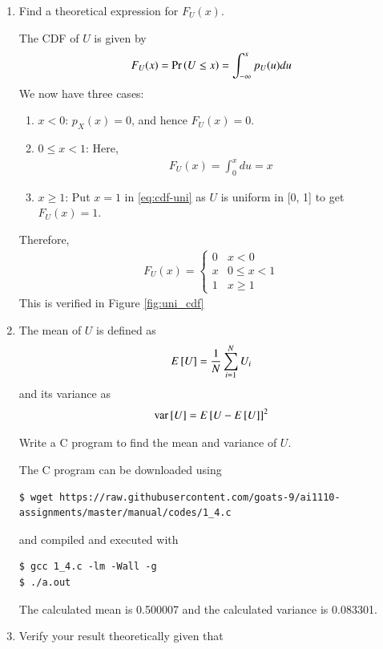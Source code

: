 \documentclass[journal,12pt,twocolumn]{IEEEtran}
\renewcommand\thesection{\arabic{section}}
\begin{document}
\begin{enumerate}[label=\thesection.\arabic*
,ref=\thesection.\theenumi]
%
\item
Find a theoretical expression for $F_{U}(x)$.

\solution
The CDF of $U$ is given by
		\begin{align}
			F_U(x) = \Pr\left(U \leq x\right) = \int_{-\infty}^{x}p_U(u)du
		\end{align}
We now have three cases:
		\begin{enumerate}
			\item $x < 0$: $p_X(x) = 0$, and hence $F_U(x) = 0$.
			\item $0 \leq x < 1$: Here,
				\begin{align}
					F_U(x) = \int_{0}^{x}du = x
					\label{eq:cdf-uni}
				\end{align}
			\item $x \geq 1$: Put $x = 1$ in \eqref{eq:cdf-uni} as $U$ is uniform in [0, 1] to get $F_U(x) = 1$.
		\end{enumerate}
Therefore,
		\begin{align}
			F_U(x) = 
			\begin{cases}
				0 & x < 0 \\
				x & 0 \leq x < 1 \\
				1 & x \geq 1
			\end{cases}
			\label{eq:cdf-ans}
		\end{align}
This is verified in Figure \eqref{fig:uni_cdf}
\item
The mean of $U$ is defined as
%
\begin{equation}
E{}\left[U\right] = \frac{1}{N}\sum_{i=1}^{N}U_i
	\label{eq:mean-form}
\end{equation}
%
and its variance as
%
\begin{equation}
\text{var}{}\left[U\right] = E{}\left[U- E{}\left[U\right]\right]^2 
	\label{eq:var-form}
\end{equation}

Write a C program to  find the mean and variance of $U$.

\solution
The C program can be downloaded using
\begin{lstlisting}
$ wget https://raw.githubusercontent.com/goats-9/ai1110-assignments/master/manual/codes/1_4.c
\end{lstlisting}
and compiled and executed with
\begin{lstlisting}
$ gcc 1_4.c -lm -Wall -g
$ ./a.out
\end{lstlisting}
The calculated mean is 0.500007 and the calculated variance is 0.083301.

\item Verify your result theoretically given that
\end{enumerate}
\end{document}
